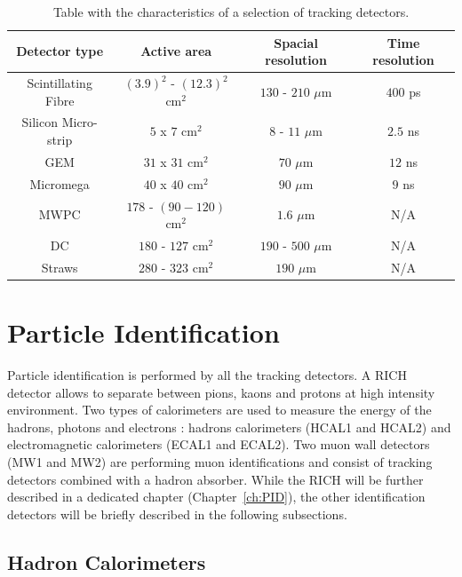 \begin{table}[!h]
  \caption{Table with the characteristics of a selection of tracking detectors.}
  \label{tab:kinvar}
  \centering
  \begin{tabular}{c|c|c|c}
    \hline
    \hline
    Detector type & Active area & Spacial resolution & Time resolution \\
    \hline
    \hline
    Scintillating Fibre & $(3.9)^2$ - $(12.3)^2$ cm$^2$ & $130$ - $210$ $\mu$m & $400$ ps \\
    Silicon Micro-strip & $5$ x $7$ cm$^2$ & $8$ - $11$ $\mu$m & $2.5$ ns \\
    GEM & $31$ x $31$ cm$^2$ & $70$ $\mu$m & $12$ ns \\
    Micromega & $40$ x $40$ cm$^2$ & $90$ $\mu$m & $9$ ns \\
    MWPC & $178$ - $(90-120)$ cm$^2$ & $1.6$ $\mu$m & N/A \\
    DC & $180$ - $127$ cm$^2$ & $190$ - $500$ $\mu$m & N/A \\
    Straws & $280$ - $323$ cm$^2$ & $190$ $\mu$m & N/A \\
    \hline
    \hline
  \end{tabular}
\end{table}


\section{Particle Identification}

Particle identification is performed by all the tracking detectors. A RICH detector allows to separate between pions, kaons and protons at high intensity environment. Two types of calorimeters are used to measure the energy of the hadrons, photons and electrons : hadrons calorimeters (HCAL1 and HCAL2) and electromagnetic calorimeters (ECAL1 and ECAL2). Two muon wall detectors (MW1 and MW2) are performing muon identifications and consist of tracking detectors combined with a hadron absorber. While the RICH will be further described in a dedicated chapter (Chapter~\ref{ch:PID}), the other identification detectors will be briefly described in the following subsections.

\subsection{Hadron Calorimeters}


